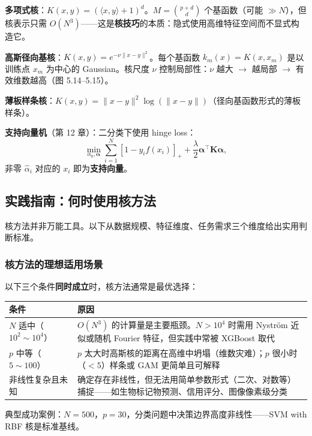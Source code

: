 \textbf{多项式核}：$K(x,y) = (\langle x,y\rangle + 1)^d$。$M = \binom{p+d}{d}$ 个基函数（可能 $\gg N$），但核表示只需 $O(N^3)$——这是\textbf{核技巧}的本质：隐式使用高维特征空间而不显式构造它。

\textbf{高斯径向基核}：$K(x,y) = e^{-\nu\|x-y\|^2}$。每个基函数 $k_m(x) = K(x, x_m)$ 是以训练点 $x_m$ 为中心的 Gaussian。核尺度 $\nu$ 控制局部性：$\nu$ 越大 $\to$ 越局部 $\to$ 有效维数越高（图 5.14--5.15）。

\textbf{薄板样条核}：$K(x,y) = \|x-y\|^2\log(\|x-y\|)$（径向基函数形式的薄板样条）。

\textbf{支持向量机}（第 12 章）：二分类下使用 hinge loss：
\[
\min_{\alpha_0, \boldsymbol{\alpha}} \sum_{i=1}^{N} [1 - y_i f(x_i)]_+ + \frac{\lambda}{2}\boldsymbol{\alpha}^\top\mathbf{K}\boldsymbol{\alpha},
\]
非零 $\hat{\alpha}_i$ 对应的 $x_i$ 即为\textbf{支持向量}。

\subsection{实践指南：何时使用核方法}

核方法并非万能工具。以下从数据规模、特征维度、任务需求三个维度给出实用判断标准。

\subsubsection{核方法的理想适用场景}

以下三个条件\textbf{同时成立}时，核方法通常是最优选择：

\begin{center}
\begin{tabular}{p{3cm}|p{9cm}}
\toprule
条件 & 原因 \\
\midrule
$N$ 适中（$10^2 \sim 10^4$） & $O(N^3)$ 的计算量是主要瓶颈。$N > 10^4$ 时需用 Nyström 近似或随机 Fourier 特征，但实践中常被 XGBoost 取代 \\
\hline
$p$ 中等（$5 \sim 100$） & $p$ 太大时高斯核的距离在高维中坍塌（维数灾难）；$p$ 很小时（$<5$）样条或 GAM 更简单且可解释 \\
\hline
非线性复杂且未知  & 确定存在非线性，但无法用简单参数形式（二次、对数等）捕捉——如生物标记物预测、信用评分、图像像素级分类 \\
\bottomrule
\end{tabular}
\end{center}

典型成功案例：$N = 500$，$p = 30$，分类问题中决策边界高度非线性——SVM with RBF 核是标准基线。

